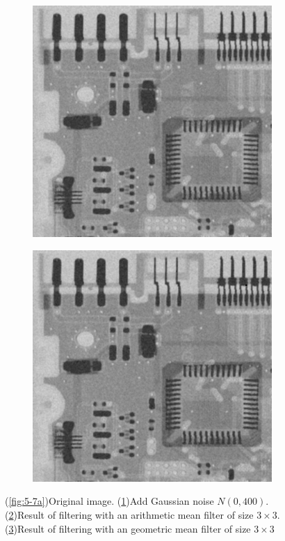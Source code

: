 \begin{figure}[h]
\begin{subfigure}[b]{0.4\linewidth}
		\caption{}
		\label{fig:5-7b}
	\end{subfigure}
  	\begin{subfigure}[b]{0.4\linewidth}
		\includegraphics[width=\linewidth]{myfigure/p4/42-gau-arimean.png}
		\caption{}
		\label{fig:5-7c}
	\end{subfigure}
  	\begin{subfigure}[b]{0.4\linewidth}
		\includegraphics[width=\linewidth]{myfigure/p4/42-gau-geomean.png}
		\caption{}
		\label{fig:5-7d}
	\end{subfigure}
  	\caption{(\ref{fig:5-7a})Original image. (\ref{fig:5-7b})Add Gaussian noise $N(0,400)$. (\ref{fig:5-7c})Result of filtering with an arithmetic mean filter of size $3\times 3$. (\ref{fig:5-7d})Result of filtering with an geometric mean filter of size $3\times 3$}
  	\label{fig:5-7}
\end{figure}

